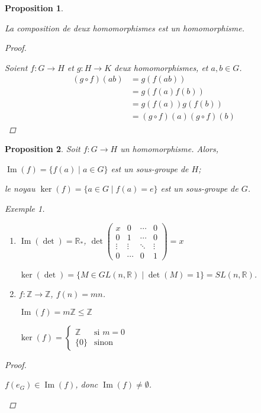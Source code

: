 \documentclass{report}
\newcommand*{\lte}{\leqslant}
\newcommand*{\reels}{\mathbb{R}}
\newcommand*{\entiers}{\mathbb{Z}}
\newcommand*{\image}{\operatorname{Im}}
\newtheorem*{prop}{Proposition}
\theoremstyle{definition}
\theoremstyle{remark}
\newtheorem*{exem}{Exemple}
\begin{document}
	\begin{prop}~

		La composition de deux homomorphismes est un homomorphisme.
		\begin{proof}~

			Soient $f:G \to H$ et $g:H \to K$ deux homomorphismes, et $a,b \in G$.
			\begin{align*}
				(g \circ f)(ab)&= g(f(ab))\\
				&= g(f(a)f(b))\\
				&= g(f(a))g(f(b))\\
				&= (g \circ f)(a) (g \circ f)(b)
			\end{align*}
		\end{proof}
	\end{prop}
	\begin{prop}
		Soit $f:G \to H$ un homomorphisme. Alors,
		\begin{nlist}
			\item 	$\image(f) = \{f(a) \mid a \in G\}$ est un sous-groupe de $H$;
			\item le \emph{noyau} $\ker(f) = \{a \in G \mid f(a) = e\}$ est un sous-groupe de $G$.
		\end{nlist}
		\begin{exem}~

			\begin{enumerate}[label=(\alph*)]
				\item $\image(\det) = \reels_*$, $\det\begin{pmatrix}
					x&0&\dotsb&0\\
					0&1&\dotsb&0\\
					\vdots&\vdots&\ddots&\vdots\\
					0&\dotsb&0&1
				\end{pmatrix}=x$

				$\ker(\det) = \{M \in GL(n,\reels) \mid \det(M)=1\} = SL(n,\reels)$.
				\item $f:\entiers \to \entiers$, $f(n)=mn$.

				$\image(f) = m\entiers \lte \entiers$

				$\ker(f) = \left\{ \begin{array}{rl}
					\entiers&\text{si } m=0\\
					\{0\}&\text{sinon}
				\end{array} \right.$
			\end{enumerate}
		\end{exem}
		\begin{proof}~

			\begin{nlist}
				\item $f(e_G) \in \image(f)$, donc $\image(f) \neq \emptyset$.


\end{nlist}
\end{proof}
\end{prop}
\end{document}
